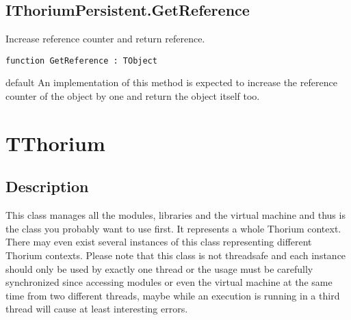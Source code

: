 \subsection{IThoriumPersistent.GetReference}
\label{thoriumcorepkg:thorium:ithoriumpersistent:getreference}
\begin{FPCList}
\Synopsis
Increase reference counter and return reference.\Declaration 

\begin{verbatim}
function GetReference : TObject
\end{verbatim}
\Visibility
default
\Description
An implementation of this method is expected to increase the reference counter of the object by one and return the object itself too.\end{FPCList}
\section{TThorium}
\label{thoriumcorepkg:thorium:tthorium}
\subsection{Description}
This class manages all the modules, libraries and the virtual machine and thus is the class you probably want to use first. It represents a whole Thorium context. There may even exist several instances of this class representing different Thorium contexts.  Please note that this class is not threadsafe and each instance should only be used by exactly one thread or the usage must be carefully synchronized since accessing modules or even the virtual machine at the same time from two different threads, maybe while an execution is running in a third thread will cause at least interesting errors.%
